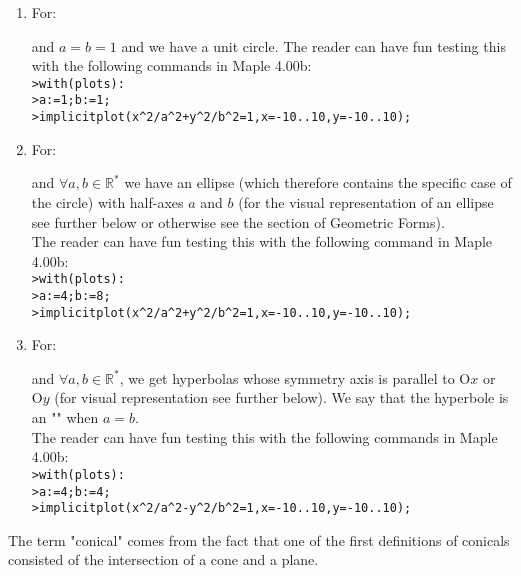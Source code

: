 \begin{enumerate}
\begin{itemize}
			\begin{enumerate}
				\item For:
					
				and $a=b=1$ and we have a unit circle. The reader can have fun testing this with the following commands in Maple 4.00b:\\
				
				\texttt{>with(plots):}\\
				\texttt{>a:=1;b:=1;}\\
				\texttt{>implicitplot(x\string^2/a\string^2+y\string^2/b\string^2=1,x=-10..10,y=-10..10);}
				
				\item For:
					
				and $\forall a,b \in \mathbb{R}^{*}$ we have an ellipse  (which therefore contains the specific case of the circle) with half-axes $a$ and $b$ (for the visual representation of an ellipse see further below or otherwise see the section of Geometric Forms).\\
				
				The reader can have fun testing this with the following command in Maple 4.00b:\\
				
				\texttt{>with(plots):}\\
				\texttt{>a:=4;b:=8;}\\
				\texttt{>implicitplot(x\string^2/a\string^2+y\string^2/b\string^2=1,x=-10..10,y=-10..10);}
				\item For:
				
				and $\forall a,b \in \mathbb{R}^{*}$, we get hyperbolas whose symmetry axis is parallel to $\text{O}x$ or $\text{O}y$ (for visual representation see further below). We say that the hyperbole is an "" when $a = b$.\\
				
				The reader can have fun testing this with the following commands in Maple 4.00b:\\
				
				\texttt{>with(plots):}\\
				\texttt{>a:=4;b:=4;}\\
				\texttt{>implicitplot(x\string^2/a\string^2-y\string^2/b\string^2=1,x=-10..10,y=-10..10);}	
			\end{enumerate}
		\end{itemize}
		The term "conical" comes from the fact that one of the first definitions of conicals consisted of the intersection of a cone and a plane.
		

\end{enumerate}
